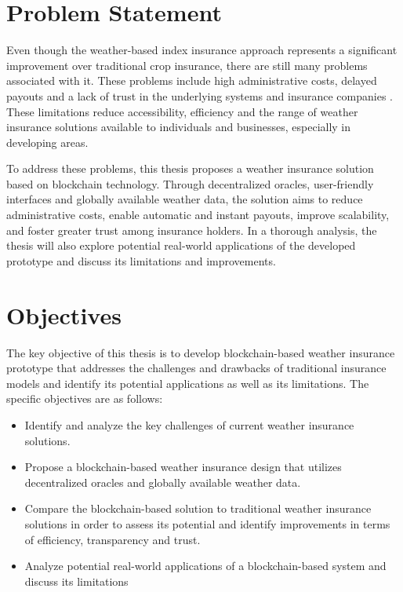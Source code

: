 \section{Problem Statement}\label{section:problem_statement}
Even though the weather-based index insurance approach represents a significant improvement over traditional crop insurance, there are still many problems associated with it. These problems include high administrative costs, delayed payouts and a lack of trust in the underlying systems and insurance companies \autocite{skees2008challenges}. These limitations reduce accessibility, efficiency and the range of weather insurance solutions available to individuals and businesses, especially in developing areas.

To address these problems, this thesis proposes a weather insurance solution based on blockchain technology. Through decentralized oracles, user-friendly interfaces and globally available weather data, the solution aims to reduce administrative costs, enable automatic and instant payouts, improve scalability, and foster greater trust among insurance holders. In a thorough analysis, the thesis will also explore potential real-world applications of the developed prototype and discuss its limitations and improvements.

\section{Objectives}\label{section:objectives}

The key objective of this thesis is to develop blockchain-based weather insurance prototype that addresses the challenges and drawbacks of traditional insurance models and identify its potential applications as well as its limitations. The specific objectives are as follows:

\begin{itemize}
    \item Identify and analyze the key challenges of current weather insurance solutions.
    \item Propose a blockchain-based weather insurance design that utilizes decentralized oracles and globally available weather data.
    \item Compare the blockchain-based solution to traditional weather insurance solutions in order to assess its potential and identify improvements in terms of efficiency, transparency and trust.
    \item Analyze potential real-world applications of a blockchain-based system and discuss its limitations
\end{itemize}
